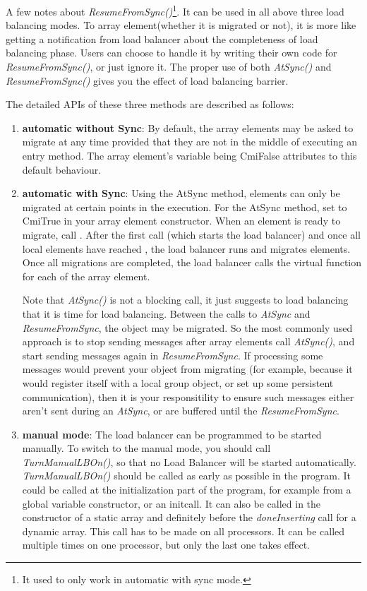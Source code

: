 A few notes about {\em ResumeFromSync()}\footnote{It used to 
only work in automatic with sync mode.}. It can be used in all above three
load balancing modes. To array element(whether it is migrated or not), 
it is more like getting a notification from load
balancer about the completeness of load balancing phase.
Users can choose to handle it by writing their own
code for {\em ResumeFromSync()}, or just ignore it. The proper use of both 
{\em AtSync()} and {\em ResumeFromSync()} gives you the effect of 
load balancing barrier. 

The detailed APIs of these three methods are described as follows:
\begin{enumerate}

\item {\bf automatic without Sync}: By default, the array elements may be asked to migrate at any time
provided that they are not in the middle of executing an entry method. 
The array element's variable  being CmiFalse attributes
to this default behaviour. 

\item {\bf automatic with Sync}: Using the AtSync method, elements can 
only be migrated at certain points in the execution. For the AtSync method, 
set  to CmiTrue in your 
array element constructor.  When an element is ready to migrate,
call .  
After the first  call (which starts the load balancer)
and once all local elements have reached ,
the load balancer runs and migrates elements.  Once
all migrations are completed, the load balancer calls the 
virtual function  for each of the
array element.  

Note that {\em AtSync()} is not a blocking call, it just suggests to load 
balancing that it is time for load balancing. Between the calls to 
{\em AtSync} and {\em ResumeFromSync}, the object
may be migrated. So the most commonly used approach is to stop sending
messages after array elements call {\em AtSync()}, and start sending
messages again in {\em ResumeFromSync}.
If processing some messages would prevent your object
from migrating (for example, because it would register itself with
a local group object, or set up some persistent communication),
then it is your responsitility to ensure such messages either aren't
sent during an {\em AtSync}, or are buffered until the {\em ResumeFromSync}.

\item {\bf manual mode}: The load balancer can be programmed to be started
manually. To switch to the manual mode, you should call
{\em TurnManualLBOn()}, so that no Load Balancer will be started automatically.
{\em TurnManualLBOn()} should be called as early as possible in the
program. It could be called at the initialization part of the program, 
for example from a global variable constructor, or an initcall.
It can also be called in the constructor of a static array and
definitely before the {\em doneInserting} call for a dynamic array.  This call 
has to be made on all processors. It can be called multiple times on one 
processor, but only the last one takes effect.   


\end{enumerate}
